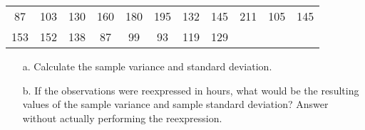 \documentclass[letterpaper,12pt]{article}
\begin{document}
\begin{enumerate}
\begin{center}
      \begin{tabular}{*{11}{S[table-format=3.0]}}
        87 & 103 & 130 & 160 & 180 & 195 & 132 & 145 & 211 & 105 & 145 \\
        153 & 152 & 138 & 87 & 99 & 93 & 119 & 129
      \end{tabular}
    \end{center}
    \begin{enumerate}
      \item[a.]
        Calculate the sample variance and standard deviation.
      \item[b.]
        If the observations were reexpressed in hours, what would be the resulting values of the sample variance and sample standard deviation? Answer without actually performing the reexpression.
    \end{enumerate}
\end{enumerate}
\end{document}
